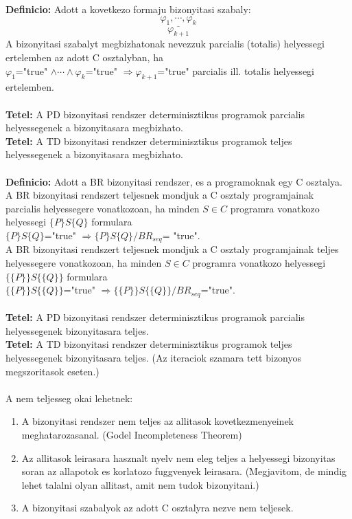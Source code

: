 \documentclass[a4paper,10pt]{article}
\begin{document}
\textbf{Definicio:} Adott a kovetkezo formaju bizonyitasi szabaly:
$$\underline{\varphi_1, \cdots, \varphi_k}$$
$$\varphi_{k+1}$$
A bizonyitasi szabalyt megbizhatonak nevezzuk parcialis (totalis) helyessegi ertelemben az adott C osztalyban, ha\\
$\varphi_1$="true" $\wedge\cdots\wedge\varphi_k$="true" $\Rightarrow\varphi_{k+1}$="true" parcialis ill. totalis helyessegi ertelemben.\\\\
\textbf{Tetel:} A PD bizonyitasi rendszer determinisztikus programok parcialis helyessegenek a bizonyitasara megbizhato.\\
\textbf{Tetel:} A TD bizonyitasi rendszer determinisztikus programok teljes helyessegenek a bizonyitasara megbizhato.\\
\\
\textbf{Definicio:} Adott a BR bizonyitasi rendszer, es a programoknak egy C osztalya.\\
A BR bizonyitasi rendszert teljesnek mondjuk a C osztaly programjainak parcialis helyessegere vonatkozoan, ha minden $S\in C$ programra vonatkozo helyessegi $\lbrace P\rbrace S\lbrace Q\rbrace$ formulara\\
$\lbrace P\rbrace S\lbrace Q\rbrace$="true" $\Rightarrow \lbrace P\rbrace S\lbrace Q\rbrace/BR_{seq}$= "true".\\
A BR bizonyitasi rendszert teljesnek mondjuk a C osztaly programjainak teljes helyessegere vonatkozoan, ha minden $S\in C$ programra vonatkozo helyessegi $\lbrace\lbrace P\rbrace\rbrace S \lbrace\lbrace Q\rbrace\rbrace$ formulara\\
$\lbrace\lbrace P\rbrace\rbrace S \lbrace\lbrace Q\rbrace\rbrace$="true" $\Rightarrow \lbrace\lbrace P\rbrace\rbrace S \lbrace\lbrace Q\rbrace\rbrace/BR_{seq}$="true".\\\\
\textbf{Tetel:} A PD bizonyitasi rendszer determinisztikus programok parcialis helyessegenek bizonyitasara teljes.\\
\textbf{Tetel:} A TD bizonyitasi rendszer determinisztikus programok teljes helyessegenek bizonyitasara teljes. (Az iteraciok szamara tett bizonyos megszoritasok eseten.)\\
\\
A nem teljesseg okai lehetnek:
\begin{enumerate}
\item A bizonyitasi rendszer nem teljes az allitasok kovetkezmenyeinek meghatarozasanal. (Godel Incompleteness Theorem)
\item Az allitasok leirasara hasznalt nyelv nem eleg teljes a helyessegi bizonyitas soran az allapotok es korlatozo fuggvenyek leirasara. (Megjavitom, de mindig lehet talalni olyan allitast, amit nem tudok bizonyitani.)
\item A bizonyitasi szabalyok az adott C osztalyra nezve nem teljesek.
\end{enumerate}
\end{document}

